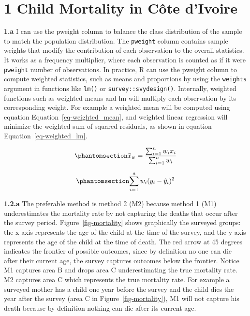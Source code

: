 \documentclass[
  letterpaper,
  DIV=11,
  numbers=noendperiod]{scrartcl}
\author{}
\date{}
\begin{document}
\section{1 Child Mortality in Côte
d'Ivoire}\label{child-mortality-in-cuxf4te-divoire}

\textbf{1.a} I can use the pweight column to balance the class
distribution of the sample to match the population distribution. The
\texttt{pweight} column contains sample weights that modify the
contribution of each observation to the overall statistics. It works as
a frequency multiplier, where each observation is counted as if it were
\texttt{pweight} number of observations. In practice, R can use the
pweight column to compute weighted statistics, such as means and
proportions by using the \texttt{weights} argument in functions like
\texttt{lm()} or \texttt{survey::svydesign()}. Internally, weighted
functions such as weighted means and lm will multiply each observation
by its corresponding weight. For example a weighted mean will be
computed using equation Equation~\ref{eq-weighted_mean}, and weighted
linear regression will minimize the weighted sum of squared residuals,
as shown in equation Equation~\ref{eq-weighted_lm}.

\begin{equation}\protect\phantomsection\label{eq-weighted_mean}{
\bar{x}_w = \frac{\sum_{i=1}^{n} w_i x_i}{\sum_{i=1}^{n} w_i}
}\end{equation}

\begin{equation}\protect\phantomsection\label{eq-weighted_lm}{
\sum_{i=1}^{n} w_i (y_i - \hat{y}_i)^2
}\end{equation}

\textbf{1.2.a} The preferable method is method 2 (M2) because method 1
(M1) underestimates the mortality rate by not capturing the deaths that
occur after the survey period. Figure~\ref{fig-mortality} shows
graphically the surveyed groups: the x-axis represents the age of the
child at the time of the survey, and the y-axis represents the age of
the child at the time of death. The red arrow at 45 degrees indicates
the frontier of possible outcomes, since by definition no one can die
after their current age, the survey captures outcomes below the
frontier. Notice M1 captures area B and drops area C underestimating the
true mortality rate. M2 captures area C which represents the true
mortality rate. For example a surveyed mother has a child one year
before the survey and the child dies the year after the survey (area C
in Figure~\ref{fig-mortality}), M1 will not capture his death because by
definition nothing can die after its current age.
\end{document}
